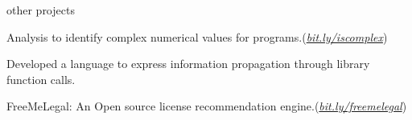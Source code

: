 \documentclass{resume} %
\begin{document}
\begin{rSection}{other projects}\smallskip \begin{lSubsection}
%
\item Analysis to identify complex numerical values for \matlab
        programs.(\href{http://bit.ly/iscomplex}{\em{bit.ly/iscomplex}}) 
\begin{lsubSubsection}
\item Developed a language to express information propagation through library
function calls.%
\end{lsubSubsection}

\item FreeMeLegal: An Open source license recommendation
engine.(\href{http://bit.ly/freemelegal}{\em{bit.ly/freemelegal}}) 
\end{lSubsection}
\end{rSection}

\end{document}
